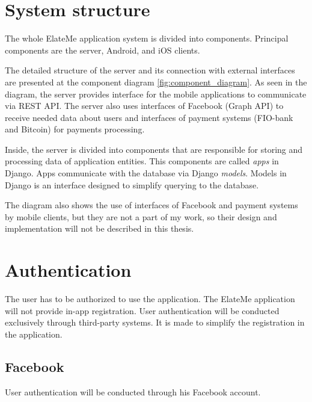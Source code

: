 


\section{System structure}
The whole ElateMe application system is divided into components. Principal components are the server, Android, and iOS
clients.

The detailed structure of the server and its connection with external inter\-faces are presented at the component diagram
\ref{fig:component_diagram}. As seen in the diagram, the server provides interface for the mobile applications to
communicate via \ac{REST} \ac{API}. The server also uses interfaces of Facebook (Graph API) to receive needed data about
users and interfaces of payment systems (FIO-bank and Bitcoin) for payments processing.

Inside, the server is divided into components that are responsible for sto\-ring and processing data of application
entities. This components are called \textit{apps} in Django. Apps communicate with the database via Django
\textit{models}. Models in Django is an interface designed to simplify querying to the database.


The diagram also shows the use of interfaces of Facebook and payment systems by mobile clients, but they are not a part
of my work, so their design and implementation will not be described in this thesis.



\section{Authentication}
The user has to be authorized to use the application. The ElateMe application will not provide in-app registration. User
authentication will be conducted exclusively through third-party systems. It is made to simplify the registration in
the application.


\subsection{Facebook}
User authentication will be conducted through his Facebook account.

